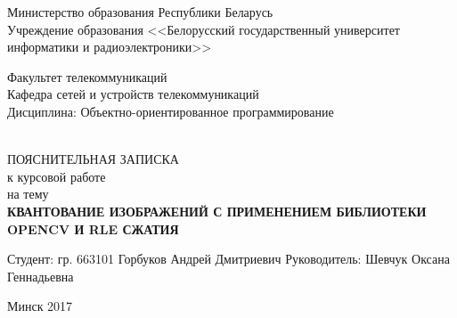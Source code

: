 \begin{titlepage}
  \begin{center}
    Министерство образования Республики Беларусь\\[0.4em]
    Учреждение образования <<Белорусский государственный университет информатики и радиоэлектроники>>\\[3.5em]

    \begin{minipage}{\textwidth}
      \begin{flushleft}
          Факультет телекоммуникаций\\[1em]

          Кафедра сетей и устройств телекоммуникаций\\[1em]

          Дисциплина: Объектно-ориентированное программирование
      \end{flushleft}
    \end{minipage}\\[3em]

    {ПОЯСНИТЕЛЬНАЯ ЗАПИСКА}\\
    {к курсовой работе}\\
    {на тему}\\[1em]
    \textbf{\MakeTextUppercase{Квантование изображений с применением библиотеки OpenCV и RLE сжатия}}\\[1em]



    \vspace{8em}

    \begin{flushright}
        \begin{minipage}{0.7\textwidth}
            Студент:  гр. 663101 Горбуков Андрей Дмитриевич 
            Руководитель: Шевчук Оксана Геннадьевна 
        \end{minipage}
    \end{flushright}

    \vfill
    {\normalsize Минск 2017}
  \end{center}
\end{titlepage}
